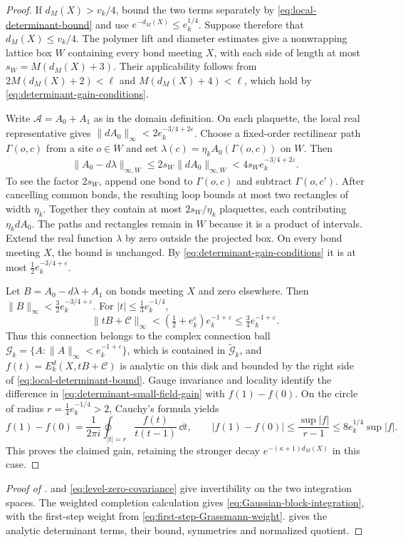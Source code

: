 \begin{proof}
If $d_M(X)>v_k/4$, bound the two terms separately by
\eqref{eq:local-determinant-bound} and use
$e^{-d_M(X)}\le e_k^{1/4}$. Suppose therefore that
$d_M(X)\le v_k/4$. The polymer lift and diameter estimates give
a nonwrapping lattice box $W$ containing every bond meeting $X$,
with each side of length at most
$s_W=M(d_M(X)+3)$.
Their applicability follows from
$2M(d_M(X)+2)<\ell$ and $M(d_M(X)+4)<\ell$, which hold by
\eqref{eq:determinant-gain-conditions}.

Write $\mathscr A=A_0+A_1$ as in the domain definition.
On each plaquette, the local real representative gives
$\|dA_0\|_\infty<2e_k^{-3/4+2\varepsilon}$.
Choose a fixed-order rectilinear path $\Gamma(o,c)$ from a site
$o\in W$ and set $\lambda(c)=\eta_k A_0(\Gamma(o,c))$ on $W$.
Then
\[
 \|A_0-d\lambda\|_{\infty,W}
             \le2s_W\|dA_0\|_{\infty,W}
             <4s_We_k^{-3/4+2\varepsilon}.
\]
To see the factor $2s_W$, append one bond to $\Gamma(o,c)$ and
subtract $\Gamma(o,c')$. After cancelling common bonds, the
resulting loop bounds at most two rectangles of width $\eta_k$.
Together they contain at most $2s_W/\eta_k$ plaquettes, each
contributing $\eta_k dA_0$. The paths and rectangles remain in
$W$ because it is a product of intervals. Extend the real function
$\lambda$ by zero outside the projected box. On every bond meeting
$X$, the bound is unchanged. By
\eqref{eq:determinant-gain-conditions} it is at most
$\tfrac12e_k^{-3/4+\varepsilon}$.

Let $B=A_0-d\lambda+A_1$ on bonds meeting $X$ and zero elsewhere.
Then $\|B\|_\infty<\tfrac32e_k^{-3/4+\varepsilon}$.
For $|t|\le\tfrac13e_k^{-1/4}$,
\[
 \|tB+\mathscr C\|_\infty
       <(\tfrac12+e_k^\varepsilon)e_k^{-1+\varepsilon}
       \le\tfrac34e_k^{-1+\varepsilon}.
\]
Thus this connection belongs to the complex connection ball
$\mathcal G_k=\{A:\|A\|_\infty<e_k^{-1+\varepsilon}\}$,
which is contained in $\widetilde{\mathcal G}_k$, and
$f(t)=E_k^d(X,tB+\mathscr C)$ is analytic on this disk and
bounded by the right side of \eqref{eq:local-determinant-bound}.
Gauge invariance and locality identify the difference in
\eqref{eq:determinant-small-field-gain} with $f(1)-f(0)$.
On the circle of radius $r=\tfrac14e_k^{-1/4}>2$, Cauchy's
formula yields
\[
 f(1)-f(0)=\frac1{2\pi i}\oint_{|t|=r}
                         \frac{f(t)}{t(t-1)}\,\dd t,
 \qquad |f(1)-f(0)|\le\frac{\sup|f|}{r-1}
                          \le8e_k^{1/4}\sup|f|.
\]
This proves the claimed gain, retaining the stronger decay
$e^{-(\kappa+1)d_M(X)}$ in this case.
\end{proof}

\begin{proof}[Proof of ]
 and
\eqref{eq:level-zero-covariance} give invertibility on the two
integration spaces. The weighted completion calculation gives
\eqref{eq:Gaussian-block-integration}, with the first-step weight from
\eqref{eq:first-step-Grassmann-weight}.
 gives the analytic determinant
terms, their bound, symmetries and normalized quotient.
\end{proof}


